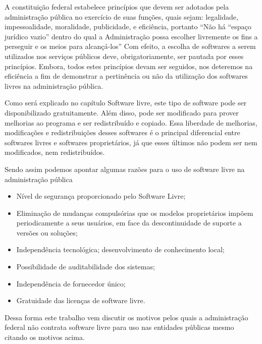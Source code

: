 A constituição federal estabelece princípios que devem ser adotados pela administração pública
no exercício de suas funções, quais sejam: legalidade, impessoalidade, moralidade, publicidade, e
eficiência, portanto “Não há “espaço jurídico vazio” dentro do qual a Administração possa escolher
livremente os fins a perseguir e os meios para alcançá-los” 
%
Com efeito, a escolha de softwares a serem utilizados nos serviços públicos deve, obrigatoriamente,
ser pautada por esses princípios. Embora, todos estes princípios devam ser seguidos, nos
deteremos na eficiência a fim de demonstrar a pertinência ou não da utilização dos softwares livres
na administração pública.\cite{coutinho2012uso}

Como será explicado no capítulo Software livre, este tipo de software pode ser disponibilizado
gratuitamente. Além disso, pode ser modificado para prover melhorias ao
programa e ser redistribuído e copiado. Essa liberdade de melhorias, modificações e redistribuições
desses softwares é o principal diferencial entre softwares livres e softwares proprietários, já que
esses últimos não podem ser nem modificados, nem redistribuídos.

Sendo assim podemos apontar algumas razões para o uso de software livre na administração 
pública

\begin{itemize}

\item Nível de segurança proporcionado pelo Software Livre;
\item Eliminação de mudanças compulsórias que os modelos proprietários impõem
periodicamente a seus usuários, em face da descontinuidade de suporte a
versões ou soluções; 
\item Independência tecnológica; desenvolvimento de
conhecimento local; 
\item Possibilidade de auditabilidade dos sistemas;
\item Independência de fornecedor único;
\item Gratuidade das licenças de software livre.
\end{itemize}

Dessa forma este trabalho vem discutir os motivos pelos quais a administração 
federal não contrata software livre para uso nas entidades públicas mesmo citando 
os motivos acima.


